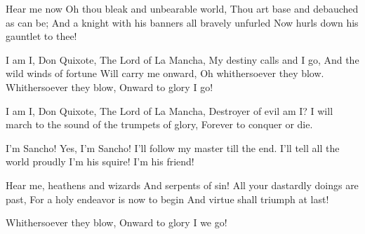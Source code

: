 
\begin{guitar}
  Hear me now
  Oh thou bleak and unbearable world,
  Thou art base and debauched as can be;
  And a knight with his banners all bravely unfurled
  Now hurls down his gauntlet to thee!

  I am I, Don Quixote,
  The Lord of La Mancha,
  My destiny calls and I go,
  And the wild winds of fortune
  Will carry me onward,
  Oh whithersoever they blow.
  Whithersoever they blow,
  Onward to glory I go!

  I am I, Don Quixote,
  The Lord of La Mancha,
  Destroyer of evil am I?
  I will march to the sound
  of the trumpets of glory,
  Forever to conquer or die.

  I'm Sancho! Yes, I'm Sancho!
  I'll follow my master till the end.
  I'll tell all the world proudly
  I'm his squire! I'm his friend!

  Hear me, heathens and wizards
  And serpents of sin!
  All your dastardly doings are past,
  For a holy endeavor is now to begin
  And virtue shall triumph at last!


  Whithersoever they blow,
  Onward to glory I {we} go!
\end{guitar}

